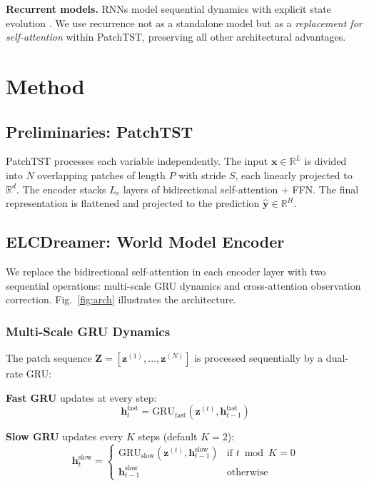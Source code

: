 \documentclass[conference]{IEEEtran}
\begin{document}
\textbf{Recurrent models.} RNNs model sequential dynamics with explicit state evolution \cite{b_rnn_attention}. We use recurrence not as a standalone model but as a \emph{replacement for self-attention} within PatchTST, preserving all other architectural advantages.

\section{Method}

\subsection{Preliminaries: PatchTST}

PatchTST \cite{b_patchtst} processes each variable independently. The input $\mathbf{x} \in \mathbb{R}^L$ is divided into $N$ overlapping patches of length $P$ with stride $S$, each linearly projected to $\mathbb{R}^d$. The encoder stacks $L_e$ layers of bidirectional self-attention + FFN. The final representation is flattened and projected to the prediction $\hat{\mathbf{y}} \in \mathbb{R}^H$.

\subsection{ELCDreamer: World Model Encoder}

We replace the bidirectional self-attention in each encoder layer with two sequential operations: multi-scale GRU dynamics and cross-attention observation correction. Fig.~\ref{fig:arch} illustrates the architecture.

\subsubsection{Multi-Scale GRU Dynamics}

The patch sequence $\mathbf{Z} = [\mathbf{z}^{(1)}, ..., \mathbf{z}^{(N)}]$ is processed sequentially by a dual-rate GRU:

\textbf{Fast GRU} updates at every step:
\begin{equation}
    \mathbf{h}_t^{\text{fast}} = \text{GRU}_{\text{fast}}(\mathbf{z}^{(t)}, \mathbf{h}_{t-1}^{\text{fast}})
\end{equation}

\textbf{Slow GRU} updates every $K$ steps (default $K=2$):
\begin{equation}
    \mathbf{h}_t^{\text{slow}} = \begin{cases}
        \text{GRU}_{\text{slow}}(\mathbf{z}^{(t)}, \mathbf{h}_{t-1}^{\text{slow}}) & \text{if } t \bmod K = 0 \\
        \mathbf{h}_{t-1}^{\text{slow}} & \text{otherwise}
    \end{cases}
\end{equation}
\end{document}
